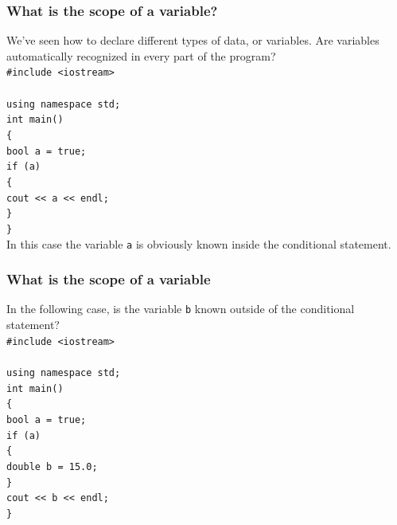 \documentclass{if-beamer}
\begin{document}
\begin{frame}
\frametitle{What is the scope of a variable?}
\vspace{1cm}
We've seen how to declare different types of data, or variables. Are
variables automatically recognized in every part of the program?\\
{\footnotesize \texttt{\#include <iostream>}} \\
{\footnotesize \texttt{}}\\
{\footnotesize \texttt{using namespace std;}} \\
{\footnotesize \texttt{int main()}} \\
{\footnotesize \texttt{\{}} \\
{\footnotesize \texttt{\quad \quad bool a = true;}} \\
{\footnotesize \texttt{\quad \quad if (a)}} \\
{\footnotesize \texttt{\quad \quad \{}} \\
{\footnotesize \texttt{\quad \quad \quad \quad cout << a << endl;}} \\
{\footnotesize \texttt{\quad \quad \}}} \\
{\footnotesize \texttt{\}}} \\
In this case the variable \texttt{a} is obviously known inside the
conditional statement.
\end{frame}

\begin{frame}
\frametitle{What is the scope of a variable}
\vspace{1cm}
In the following case, is the variable \texttt{b} known outside of the
conditional statement? \\
{\footnotesize \texttt{\#include <iostream>}} \\
{\footnotesize \texttt{}}\\
{\footnotesize \texttt{using namespace std;}} \\
{\footnotesize \texttt{int main()}} \\
{\footnotesize \texttt{\{}} \\
{\footnotesize \texttt{\quad \quad bool a = true;}} \\
{\footnotesize \texttt{\quad \quad if (a)}} \\
{\footnotesize \texttt{\quad \quad \{}} \\
{\footnotesize \texttt{\quad \quad \quad \quad double b = 15.0;}} \\
{\footnotesize \texttt{\quad \quad \}}} \\
{\footnotesize \texttt{\quad \quad cout << b << endl;}} \\
{\footnotesize \texttt{\}}} \\
\end{frame}
\end{document}
